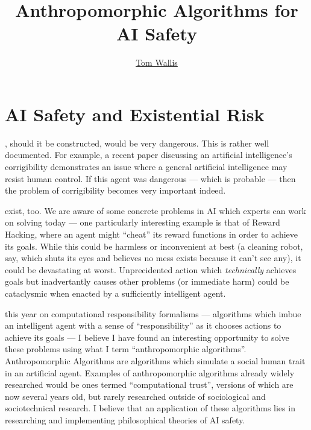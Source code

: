 
\title{Anthropomorphic Algorithms for AI Safety}
\author[Tom Wallis]{\href{http://tom.coffee}{Tom Wallis}}
\date{}



\maketitle

\section{AI Safety and Existential Risk}

, should it be constructed, would be very dangerous. This is rather well documented. For example, a recent paper discussing an artificial intelligence's corrigibility\cite{corrigability} demonstrates an issue where a general artificial intelligence may resist human control. If this agent was dangerous --- which is probable --- then the problem of corrigibility becomes very important indeed.\par

 exist, too. We are aware of some concrete problems in AI which experts can work on solving today\cite{concrete_problems} --- one particularly interesting example is that of Reward Hacking, where an agent might ``cheat'' its reward functions in order to achieve its goals. While this could be harmless or inconvenient at best (a cleaning robot, say, which shuts its eyes and believes no mess exists because it can't see any), it could be devastating at worst. Unprecidented action which \emph{technically} achieves goals but inadvertantly causes other problems (or immediate harm) could be cataclysmic when enacted by a sufficiently intelligent agent.\par

 this year on computational responsibility formalisms --- algorithms which imbue an intelligent agent with a sense of ``responsibility'' as it chooses actions to achieve its goals --- I believe I have found an interesting opportunity to solve these problems using what I term ``anthropomorphic algorithms''. Anthropomorphic Algorithms are algorithms which simulate a social human trait in an artificial agent. Examples of anthropomorphic algorithms already widely researched would be ones termed ``computational trust'', versions of which are now several years old\cite{marsh1994}, but rarely researched outside of sociological and sociotechnical research. I believe that an application of these algorithms lies in researching and implementing philosophical theories of AI safety. \par

